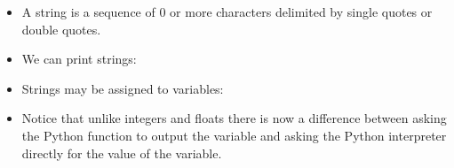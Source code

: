 \documentclass[letterpaper,10pt,english]{sphinxmanual}
\begin{document}
\label{\detokenize{lecture_notes/lec03_strings:strings-definition}}\begin{itemize}
\item {} 
A string is a sequence of 0 or more characters delimited by single
quotes or double quotes.

%
\begin{sphinxVerbatim}[commandchars=\\\{\}]
\end{sphinxVerbatim}

\item {} 
We can print strings:

%
\begin{sphinxVerbatim}[commandchars=\\\{\}]
\end{sphinxVerbatim}

\item {} 
Strings may be assigned to variables:

%
\begin{sphinxVerbatim}[commandchars=\\\{\}]
  
  
\end{sphinxVerbatim}

\item {} 
Notice that unlike integers and floats there is now a difference
between asking the Python function  to output the variable
and asking the Python interpreter directly for the value of the
variable.

\end{itemize}
\end{document}
